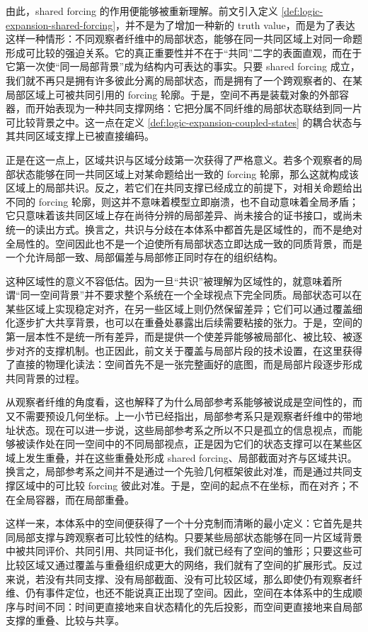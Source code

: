 由此，shared forcing 的作用便能够被重新理解。前文引入定义 \ref{def:logic-expansion-shared-forcing}，并不是为了增加一种新的 truth value，而是为了表达这样一种情形：不同观察者纤维中的局部状态，能够在同一共同区域上对同一命题形成可比较的强迫关系。它的真正重要性并不在于“共同”二字的表面直观，而在于它第一次使“同一局部背景”成为结构内可表达的事实。只要 shared forcing 成立，我们就不再只是拥有许多彼此分离的局部状态，而是拥有了一个跨观察者的、在某局部区域上可被共同引用的 forcing 轮廓。于是，空间不再是装载对象的外部容器，而开始表现为一种共同支撑网络：它把分属不同纤维的局部状态联结到同一片可比较背景之中。这一点在定义 \ref{def:logic-expansion-coupled-states} 的耦合状态与其共同区域支撑上已被直接编码。

正是在这一点上，区域共识与区域分歧第一次获得了严格意义。若多个观察者的局部状态能够在同一共同区域上对某命题给出一致的 forcing 轮廓，那么这就构成该区域上的局部共识。反之，若它们在共同支撑已经成立的前提下，对相关命题给出不同的 forcing 轮廓，则这并不意味着模型立即崩溃，也不自动意味着全局矛盾；它只意味着该共同区域上存在尚待分辨的局部差异、尚未接合的证书接口，或尚未统一的读出方式。换言之，共识与分歧在本体系中都首先是区域性的，而不是绝对全局性的。空间因此也不是一个迫使所有局部状态立即达成一致的同质背景，而是一个允许局部一致、局部偏差与局部修正同时存在的组织结构。

这种区域性的意义不容低估。因为一旦“共识”被理解为区域性的，就意味着所谓“同一空间背景”并不要求整个系统在一个全球视点下完全同质。局部状态可以在某些区域上实现稳定对齐，在另一些区域上则仍然保留差异；它们可以通过覆盖细化逐步扩大共享背景，也可以在重叠处暴露出后续需要粘接的张力。于是，空间的第一层本性不是统一所有差异，而是提供一个使差异能够被局部化、被比较、被逐步对齐的支撑机制。也正因此，前文关于覆盖与局部片段的技术设置，在这里获得了直接的物理化读法：空间首先不是一张完整画好的底图，而是局部片段逐步形成共同背景的过程。

从观察者纤维的角度看，这也解释了为什么局部参考系能够被说成是空间性的，而又不需要预设几何坐标。上一小节已经指出，局部参考系只是观察者纤维中的带地址状态。现在可以进一步说，这些局部参考系之所以不只是孤立的信息视点，而能够被读作处在同一空间中的不同局部视点，正是因为它们的状态支撑可以在某些区域上发生重叠，并在这些重叠处形成 shared forcing、局部截面对齐与区域共识。换言之，局部参考系之间并不是通过一个先验几何框架彼此对准，而是通过共同支撑区域中的可比较 forcing 彼此对准。于是，空间的起点不在坐标，而在对齐；不在全局容器，而在局部重叠。

这样一来，本体系中的空间便获得了一个十分克制而清晰的最小定义：它首先是共同局部支撑与跨观察者可比较性的结构。只要某些局部状态能够在同一片区域背景中被共同评价、共同引用、共同证书化，我们就已经有了空间的雏形；只要这些可比较区域又通过覆盖与重叠组织成更大的网络，我们就有了空间的扩展形式。反过来说，若没有共同支撑、没有局部截面、没有可比较区域，那么即使仍有观察者纤维、仍有事件定位，也还不能说真正出现了空间。因此，空间在本体系中的生成顺序与时间不同：时间更直接地来自状态精化的先后投影，而空间更直接地来自局部支撑的重叠、比较与共享。

